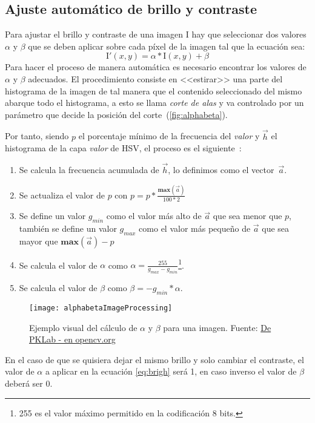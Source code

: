 \subsection{Ajuste automático de brillo y contraste}
Para ajustar el brillo y contraste de una imagen $\textrm{I}$ hay que seleccionar dos valores $\alpha$ y $\beta$ que se deben aplicar sobre cada píxel de la imagen tal que la ecuación sea:
\begin{equation}
\textrm{I}'(x,y) = \alpha*\textrm{I}(x,y) + \beta\label{eq:brigh}
\end{equation}
Para hacer el proceso de manera automática es necesario encontrar los valores de $\alpha$ y $\beta$ adecuados. 
El procedimiento consiste en <<estirar>> una parte del histograma de la imagen de tal manera que el contenido seleccionado del mismo abarque todo el histograma, a esto se llama \textit{corte de alas} y va controlado por un parámetro que decide la posición del corte~(\autoref{fig:alphabeta}).

Por tanto, siendo $p$ el porcentaje mínimo de la frecuencia del \textit{valor} y $\vec{h}$ el histograma de la capa \textit{valor} de HSV, el proceso es el siguiente~\cite{pklab2017bright}:

\begin{enumerate}
	\item Se calcula la frecuencia acumulada de $\vec{h}$, lo definimos como el vector~$\vec{a}$.
	\item Se actualiza el valor de $p$ con $p = p*\frac{\mathbf{max}(\vec{a})}{100*2}$
	\item Se define un valor $g_{min}$ como el valor más alto de $\vec{a}$ que sea menor que $p$, también se define un valor $g_{max}$ como el valor más pequeño de $\vec{a}$ que sea mayor que $\mathbf{max}(\vec{a})-p$
	\item Se calcula el valor de $\alpha$ como $\alpha =  \frac{255}{g_{max} - g_{min}}$\footnote{255 es el valor máximo permitido en la codificación 8 bits.}.
	\item Se calcula el valor de $\beta$ como $\beta = -g_{min} * \alpha$.
\end{enumerate}

\begin{figure}[h]
	\centering
	\texttt{[image: alphabetaImageProcessing]}
	\caption[Ejemplo visual del cálculo de $\alpha$ y $\beta$ para una imagen]{Ejemplo visual del cálculo de $\alpha$ y $\beta$ para una imagen. Fuente: \href{https://answers.opencv.org/question/75510/how-to-make-auto-adjustmentsbrightness-and-contrast-for-image-android-opencv-image-correction/}{De PKLab - en opencv.org}}
	\label{fig:alphabeta}
\end{figure}

En el caso de que se quisiera dejar el mismo brillo y solo cambiar el contraste, el valor de $\alpha$ a aplicar en la ecuación \eqref{eq:brigh} será 1, en caso inverso el valor de $\beta$ deberá ser 0.

